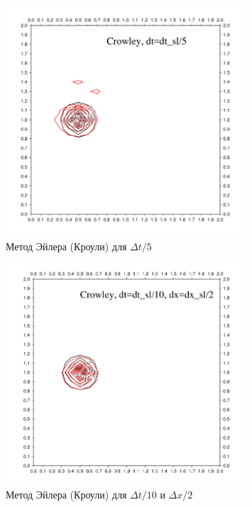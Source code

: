 \begin{figure}[ht] 
	\centering
	\includegraphics[width=0.8\textwidth,height=0.8\textwidth]{images/6_10}
	\caption{Метод Эйлера (Кроули) для $\Delta t/5$}
	\label{img:6_10}
\end{figure}
%
%
\begin{figure}[ht] 
	\centering
	\includegraphics[width=0.8\textwidth,height=0.8\textwidth]{images/6_11}
	\caption{Метод Эйлера (Кроули) для $\Delta t/10$ и $\Delta x/2$}
	\label{img:6_11}
\end{figure}
%

